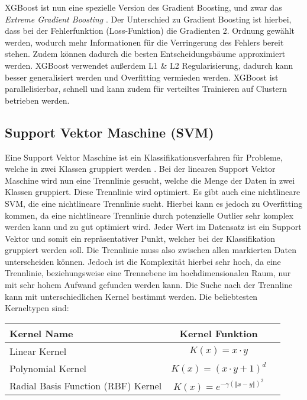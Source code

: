 XGBoost ist nun eine spezielle Version des Gradient Boosting, und zwar das \textit{Extreme Gradient Boosting} \cite{chenXGBoostScalableTree2016}.
Der Unterschied zu Gradient Boosting ist hierbei, dass bei der Fehlerfunktion (Loss-Funktion) die Gradienten 2. Ordnung gewählt werden, wodurch mehr Informationen für die Verringerung des Fehlers bereit stehen.
Zudem können dadurch die besten Entscheidungsbäume approximiert werden. 
XGBoost verwendet außerdem L1 \& L2 Regularisierung, dadurch kann besser generalisiert werden und Overfitting vermieden werden.
XGBoost ist parallelisierbar, schnell und kann zudem für verteiltes Trainieren auf Clustern betrieben werden.

\subsection{Support Vektor Maschine (SVM)}
\label{ch:Basics:se:ml:ss:svm}
Eine Support Vektor Maschine ist ein Klassifikationsverfahren für Probleme, welche in zwei Klassen gruppiert werden \cite{cortesSupportvectorNetworks1995}.
Bei der linearen Support Vektor Maschine wird nun eine {\glqq Trennlinie\grqq} gesucht, welche die Menge der Daten in zwei Klassen gruppiert. 
Diese Trennlinie wird optimiert.
Es gibt auch eine nichtlineare SVM, die eine nichtlineare Trennlinie sucht.
Hierbei kann es jedoch zu Overfitting kommen, da eine nichtlineare Trennlinie durch potenzielle Outlier sehr komplex werden kann und zu {\glqq gut\grqq} optimiert wird.
Jeder Wert im Datensatz ist ein Support Vektor und somit ein repräsentativer Punkt, welcher bei der Klassifikation gruppiert werden soll.
Die Trennlinie muss also zwischen allen markierten Daten unterscheiden können.
Jedoch ist die Komplexität hierbei sehr hoch, da eine Trennlinie, beziehungsweise eine Trennebene im hochdimensionalen Raum, nur mit sehr hohem Aufwand gefunden werden kann.
Die Suche nach der Trennline kann mit unterschiedlichen Kernel bestimmt werden.
Die beliebtesten Kerneltypen sind:

\begin{center}
    \begin{tabular}{ | l | c | r | }
        \hline
        Kernel Name & Kernel Funktion \\ \hline
        Linear Kernel & $K(x)=x \cdot y$ \\ 
        Polynomial Kernel & $K(x)=(x\cdot y+1)^d$ \\
        Radial Basis Function (RBF) Kernel & $K(x)=e^{-\gamma(\Vert x-y \Vert)^2}$ \\
        \hline
    \end{tabular}
\end{center}

